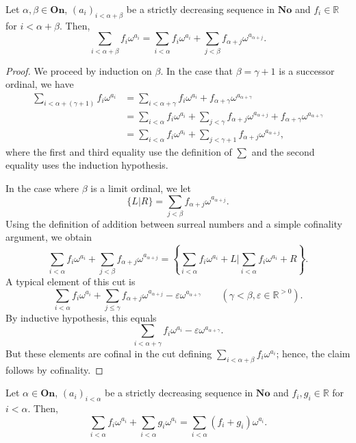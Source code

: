 
\begin{lemma}[Associativity] \label{6.7} Let $\alpha, \beta \in \textbf{On}$, $(a_i)_{i<\alpha+\beta}$ be a strictly decreasing sequence in $\textbf{No}$ and $f_i\in \mathds{R}$ for $i<\alpha+\beta$.  Then,
$$\sum_{i<\alpha+\beta} f_i\omega^{a_i}=\sum_{i<\alpha} f_i\omega^{a_i} + \sum_{j<\beta}f_{\alpha+j}\omega^{a_{\alpha+j}}.$$
\end{lemma}

\begin{proof} We proceed by induction on $\beta$.  In the case that $\beta=\gamma+1$ is a successor ordinal, we have
\begin{align*} \sum_{i<\alpha+(\gamma+1)} f_i\omega^{a_i}&= \sum_{i<\alpha+\gamma} f_i\omega^{a_i} + f_{\alpha+\gamma}\omega^{a_{\alpha+\gamma}} \\
		&= \sum_{i<\alpha} f_i\omega^{a_i}+ \sum_{j<\gamma} f_{\alpha+j} \omega^{a_{\alpha+j}}+ f_{\alpha+\gamma}\omega^{a_{\alpha+\gamma}}\\
		& = \sum_{i<\alpha} f_i\omega^{a_i} + \sum_{j<\gamma+1}f_{\alpha+j}\omega^{a_{\alpha+j}}, \end{align*}
where the first and third equality use the definition of $\sum$ and the second equality uses the induction hypothesis.  

In the case where $\beta$ is a limit ordinal, we let 
$$\{L | R\} = \sum_{j<\beta}f_{\alpha+j}\omega^{a_{\alpha+j}}.$$
Using the definition of addition between surreal numbers and a simple cofinality argument, we obtain
$$\sum_{i<\alpha}f_i\omega^{a_i} + \sum_{j<\beta}f_{\alpha+j}\omega^{a_{\alpha+j}} = \left \{\sum_{i<\alpha}f_i\omega^{a_i} + L \biggl | \sum_{i<\alpha}f_i\omega^{a_i} + R \right \}.$$
A typical element of this cut is 
$$\sum_{i<\alpha}f_i\omega^{a_i} + \sum_{j\leq \gamma} f_{\alpha+j}\omega^{a_{\alpha+j}}-\varepsilon \omega^{a_{\alpha+\gamma}}  \qquad (\gamma<\beta, \varepsilon \in \mathds{R}^{>0}).$$
By inductive hypothesis, this equals
$$\sum_{i<\alpha+\gamma}f_i \omega^{a_i}- \varepsilon \omega^{a_{\alpha+\gamma}}.$$
But these elements are cofinal in the cut defining $\sum_{i<\alpha+\beta} f_i\omega^{a_i}$; hence, the claim follows by cofinality. 
\end{proof}

\begin{proposition}  Let $\alpha \in \textbf{On}$, $(a_i)_{i<\alpha}$ be a strictly decreasing sequence in $\textbf{No}$ and $f_i, g_i\in \mathds{R}$ for $i<\alpha$. Then, 
$$\sum_{i<\alpha}f_i\omega^{a_i} + \sum_{i<\alpha} g_i \omega^{a_i} = \sum_{i<\alpha}(f_i+g_i)\omega^{a_i}.$$
\end{proposition}

